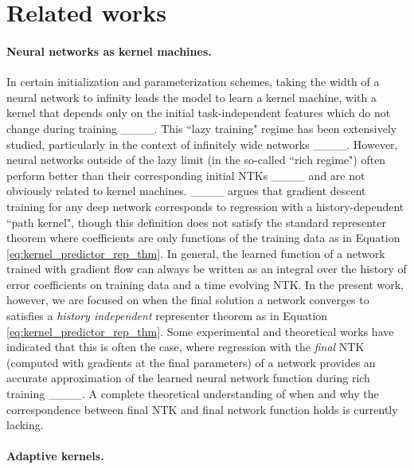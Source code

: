 \section{Related works}
\vspace{-5pt}
\paragraph{Neural networks as kernel machines.} 

In certain initialization and parameterization schemes, taking the width of a neural network to infinity leads the model to learn a kernel machine, with a kernel that depends only on the initial task-independent features which do not change during training ____.
This ``lazy training" regime has been extensively studied, particularly in the context of infinitely wide networks ____. However, neural networks outside of the lazy limit (in the so-called ``rich regime") often perform better than their corresponding initial NTKs ____ and are not obviously related to kernel machines. ____ argues that gradient descent training for any deep network corresponds to regression with a history-dependent ``path kernel", though this definition does not satisfy the standard representer theorem where coefficients are only functions of the training data as in Equation \eqref{eq:kernel_predictor_rep_thm}. In general, the learned function of a network trained with gradient flow can always be written as an integral over the history of error coefficients on training data and a time evolving NTK. In the present work, however, we are focused on when the final solution a network converges to satisfies a \textit{history independent} representer theorem as in Equation \ref{eq:kernel_predictor_rep_thm}. Some experimental and theoretical works have indicated that this is often the case, where regression with the \textit{final} NTK (computed with gradients at the final parameters) of a network provides an accurate approximation of the learned neural network function during rich training ____. A complete theoretical understanding of when and why the correspondence between final NTK and final network function holds is currently lacking.

\vspace{-5pt}
\paragraph{Adaptive kernels.}

